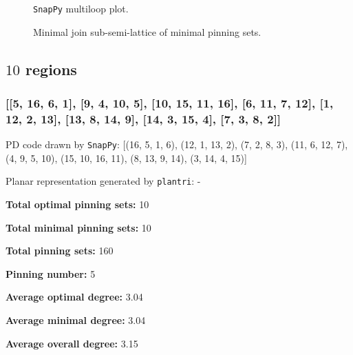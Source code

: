 \documentclass{article}%
\begin{document}
\begin{multicols}{2}
\begin{figure}[H]
\centering

\caption{\texttt{SnapPy} multiloop plot.}
\label{fig:tex/img/[[4, 8, 1, 5], [5, 9, 6, 12], [3, 11, 4, 12], [7, 10, 8, 11], [1, 10, 2, 9], [6, 2, 7, 3]].svg}
\end{figure}
\columnbreak

\begin{figure}[H]
\centering
\scalebox{0.8}{}
\caption{Minimal join sub-semi-lattice of minimal pinning sets.}
\label{fig:tex/img/[[4, 8, 1, 5], [5, 9, 6, 12], [3, 11, 4, 12], [7, 10, 8, 11], [1, 10, 2, 9], [6, 2, 7, 3]].pgf}
\end{figure}
\end{multicols}

\newpage

\subsection{$10$ regions}

\subsubsection{[[5, 16, 6, 1], [9, 4, 10, 5], [10, 15, 11, 16], [6, 11, 7, 12], [1, 12, 2, 13], [13, 8, 14, 9], [14, 3, 15, 4], [7, 3, 8, 2]]}

{\small\noindent PD code drawn by \texttt{SnapPy}: [(16, 5, 1, 6), (12, 1, 13, 2), (7, 2, 8, 3), (11, 6, 12, 7), (4, 9, 5, 10), (15, 10, 16, 11), (8, 13, 9, 14), (3, 14, 4, 15)]}

{\small\noindent Planar representation generated by \texttt{plantri}: -}

\begin{multicols}{2}
{\normalsize \noindent\textbf{Total optimal pinning sets:} 10

\noindent\textbf{Total minimal pinning sets:} 10

\noindent\textbf{Total pinning sets:} 160

\noindent\textbf{Pinning number:} 5

}
\columnbreak

{\normalsize \noindent\textbf{Average optimal degree:} 3.04

\noindent\textbf{Average minimal degree:} 3.04

\noindent\textbf{Average overall degree:} 3.15

}
\end{multicols}
\end{document}
